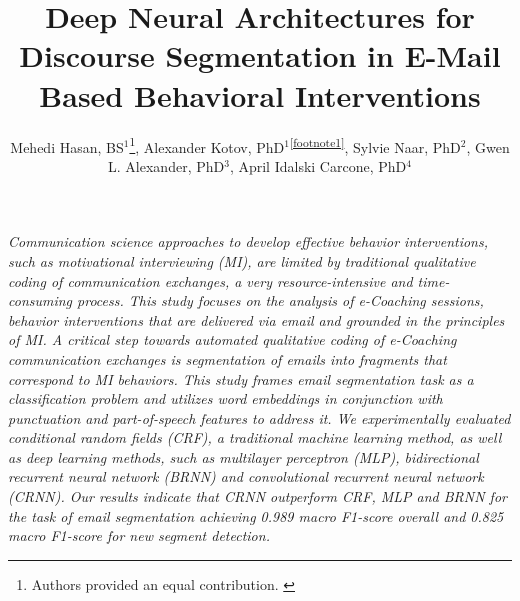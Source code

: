 \documentclass{amia}
\begin{document}
\title{Deep Neural Architectures for Discourse Segmentation in E-Mail Based Behavioral Interventions}

\author{Mehedi Hasan, BS$^{1}$\footnote{Authors provided an equal contribution. \label{footnote1}}, Alexander Kotov, PhD$^{1}$\textsuperscript{\ref{footnote1}}, Sylvie Naar, PhD$^{2}$, Gwen L. Alexander, PhD$^{3}$, April Idalski Carcone, PhD$^{4}$}


\maketitle

\textit{Communication science approaches to develop effective behavior interventions, such as motivational interviewing (MI), are limited by traditional qualitative coding of communication exchanges, a very resource-intensive and time-consuming process. This study focuses on the analysis of e-Coaching sessions, behavior interventions that are delivered via email and grounded in the principles of MI. A critical step towards automated qualitative coding of e-Coaching communication exchanges is segmentation of emails into fragments that correspond to MI behaviors. This study frames email segmentation task as a classification problem and utilizes word embeddings in conjunction with punctuation and part-of-speech features to address it. We experimentally evaluated conditional random fields (CRF), a traditional machine learning method, as well as deep learning methods, such as multilayer perceptron (MLP), bidirectional recurrent neural network (BRNN) and convolutional recurrent neural network (CRNN). Our results indicate that CRNN outperform CRF, MLP and BRNN for the task of email segmentation achieving 0.989 macro F1-score overall and 0.825 macro F1-score for new segment detection.}
\end{document}
